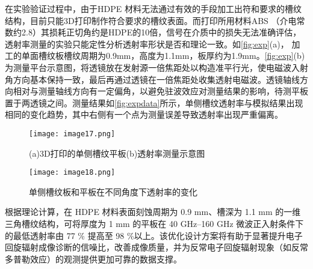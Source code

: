 在实验验证过程中，由于HDPE 材料无法通过有效的手段加工出符和要求的槽纹结构，目前只能3D打印制作符合要求的槽纹表面。而打印所用材料ABS （介电常数约2.8\cite{RN2062}）其损耗正切角约是HDPE的10倍\cite{RN2061}，信号在介质中的损失无法准确评估，透射率测量的实验只能定性分析透射率形状是否和理论一致。如\autoref{fig:exp}(a)， 加工的单面槽纹板槽纹周期为0.9mm，高度为1.1mm，板厚约为1.9mm。\autoref{fig:exp}(b)为测量平台示意图，将透镜放在发射源一倍焦距处以构造准平行光，使电磁波入射角方向基本保持一致，最后再通过透镜在一倍焦距处收集透射电磁波。透镜轴线方向相对与测量轴线方向有一定偏角，以避免驻波效应对测量结果的影响，待测平板置于两透镜之间。测量结果如\autoref{fig:expdata}所示，单侧槽纹透射率与模拟结果出现相同的变化趋势，其中右侧有一个点为测量误差导致透射率出现严重偏离。



\begin{figure}[ht]
\centering
\texttt{[image: image17.png]}
\caption{\label{fig:exp}(a)3D打印的单侧槽纹平板(b)透射率测量示意图}
\end{figure}

\begin{figure}[ht]
\centering
\texttt{[image: image18.png]}
\caption{\label{fig:expdata}单侧槽纹板和平板在不同角度下透射率的变化}
\end{figure}

根据理论计算，在 HDPE 材料表面刻蚀周期为 0.9 mm、槽深为 1.1 mm 的一维三角槽纹结构，可将厚度为 1 mm 的平板在 40 GHz–160 GHz 微波正入射条件下的最低透射率由 77 \% 提高至 98 \%以上。该优化设计方案将有助于显著提升电子回旋辐射成像诊断的信噪比，改善成像质量，并为反常电子回旋辐射现象（如反常多普勒效应）的观测提供更加可靠的数据支撑。

